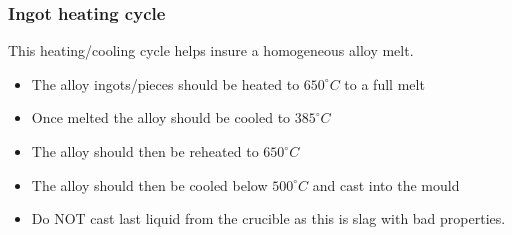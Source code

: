 \subsubsection{Ingot heating cycle}

This heating/cooling cycle helps insure a homogeneous alloy melt.
\begin{itemize}
\item The \MgZnCa alloy ingots/pieces should be heated to $650^{\circ}C$ to a full melt
\item Once melted the alloy should be cooled to $385^{\circ}C$
\item The alloy should then be reheated to $650^{\circ}C$
\item The alloy should then be cooled below $500^{\circ}C$ and cast into the mould
\item Do NOT cast last liquid from the crucible as this is slag with bad properties. 
\end{itemize}